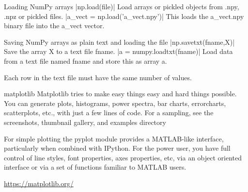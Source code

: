 \documentclass[10pt]{beamer}
\begin{document}
\begin{frame}[fragile]{Loading NumPy arrays}
|np.load(file)|
Load arrays or pickled objects from .npy, .npz or pickled files.
|a_vect = np.load('a_vect.npy')|
This loads the a\_vect.npy binary file into the a\_vect vector.
\end{frame}

\begin{frame}[fragile]{Saving NumPy arrays as plain text and loading the file}
|np.savetxt(fname,X)|
Save the array X to a text file fname.
|a = numpy.loadtxt(fname)|
Load data from a text file named fname and store this as array a.

Each row in the text file must have the same number of values.
\end{frame}




\begin{frame}{matplotlib}
Matplotlib tries to make easy things easy and hard things possible. You can generate plots, histograms, power spectra, bar charts, errorcharts, scatterplots, etc., with just a few lines of code. For a sampling, see the screenshots, thumbnail gallery, and examples directory

For simple plotting the pyplot module provides a MATLAB-like interface, particularly when combined with IPython. For the power user, you have full control of line styles, font properties, axes properties, etc, via an object oriented interface or via a set of functions familiar to MATLAB users.

\url{https://matplotlib.org/}
\end{frame}
\end{document}
